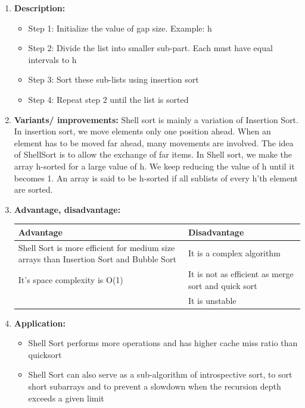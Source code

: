 \documentclass[11pt,a4paper]{article}
\begin{document}
{\begin{enumerate}[label=\textbf{\arabic*})]
				\item \textbf{Description:}
					\begin{itemize}
						\item Step 1: Initialize the value of gap size. Example: h
                        \item Step 2: Divide the list into smaller sub-part. Each must have equal intervals to h
                        \item Step 3: Sort these sub-lists using insertion sort
                        \item Step 4: Repeat step 2 until the list is sorted
					\end{itemize}
				\item \textbf{Variants/ improvements:}
					Shell sort is mainly a variation of Insertion Sort. In insertion sort, we move elements only one position ahead. When an element has to be moved far ahead, many movements are involved. The idea of ShellSort is to allow the exchange of far items. In Shell sort, we make the array h-sorted for a large value of h. We keep reducing the value of h until it becomes 1. An array is said to be h-sorted if all sublists of every h’th element are sorted.
				\item \textbf{Advantage, disadvantage:}
					\begin{table}[H]
						\centering
						\begin{tabular}{|p{8cm}|p{8cm}|}
							\hline
							\textbf{Advantage} & \textbf{Disadvantage} \\
							\hline
							\hline
							Shell Sort is more efficient for medium size arrays than Insertion Sort and Bubble Sort & It is a complex algorithm \\[12pt]
							It’s space complexity is O(1)  & It is not as efficient as merge sort and quick sort\\[12pt]
							 & It is unstable\\
							\hline
						\end{tabular}
					\end{table}
				\item \textbf{Application:}	
					\begin{itemize}
						\item Shell Sort performs more operations and has higher cache miss ratio than quicksort
						\item Shell Sort can also serve as a sub-algorithm of introspective sort, to sort short subarrays and to prevent a slowdown when the recursion depth exceeds a given limit
					\end{itemize}
			\end{enumerate}
		
}
\end{document}
